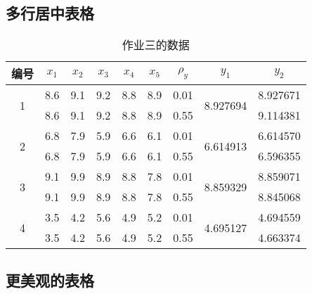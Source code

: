 \documentclass[14pt,a4paper,UTF8,twoside]{article}
\begin{document}
\subsection{多行居中表格}

\begin{table}[H]
	\centering
	\caption{作业三的数据}
	\begin{tabular}{|c|c|c|c|c|c|c|c|c|}
	  \hline
	  编号 & $x_1$ & $x_2$ & $x_3$ & $x_4$ & $x_5$ & $\rho_y$ & $y_1$ & $y_2$ \\
	  \hline
	  \multirow{2}{*}{1} & 8.6 & 9.1 & 9.2 & 8.8 & 8.9 & 0.01 & \multirow{2}{*}{8.927694} & 8.927671 \\
						 & 8.6 & 9.1 & 9.2 & 8.8 & 8.9 & 0.55 &                       & 9.114381 \\
	  \hline
	  \multirow{2}{*}{2} & 6.8 & 7.9 & 5.9 & 6.6 & 6.1 & 0.01 & \multirow{2}{*}{6.614913} & 6.614570 \\
						 & 6.8 & 7.9 & 5.9 & 6.6 & 6.1 & 0.55 &                       & 6.596355 \\
	  \hline
	  \multirow{2}{*}{3} & 9.1 & 9.9 & 8.9 & 8.8 & 7.8 & 0.01 & \multirow{2}{*}{8.859329} & 8.859071 \\
						 & 9.1 & 9.9 & 8.9 & 8.8 & 7.8 & 0.55 &                       & 8.845068 \\
	  \hline
	  \multirow{2}{*}{4} & 3.5 & 4.2 & 5.6 & 4.9 & 5.2 & 0.01 & \multirow{2}{*}{4.695127} & 4.694559 \\
						 & 3.5 & 4.2 & 5.6 & 4.9 & 5.2 & 0.55 &                       & 4.663374 \\
	  \hline
	\end{tabular}
\end{table}

\subsection{更美观的表格}
\end{document}
